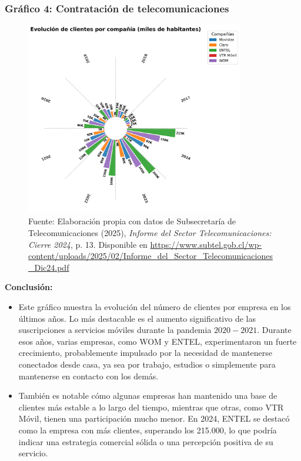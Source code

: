 \documentclass[12pt, a4paper]{article}
\begin{document}
\subsubsection*{Gráfico 4: Contratación de telecomunicaciones}
\begin{figure}[H]
    \centering
    \includegraphics[width=0.85\textwidth]{images/graph2_JG.png}
    \caption{
        Fuente: Elaboración propia con datos de Subsecretaría de Telecomunicaciones (2025), 
        \textit{Informe del Sector Telecomunicaciones: Cierre 2024}, p. 13. 
        Disponible en \url{https://www.subtel.gob.cl/wp-content/uploads/2025/02/Informe_del_Sector_Telecomunicaciones_Dic24.pdf}
    }

\end{figure}


\textbf{Conclusión:}  
\begin{itemize}
    \item Este gráfico muestra la evolución del número de clientes por empresa en los últimos años. Lo más destacable es el aumento significativo de las suscripciones a servicios móviles durante la pandemia \(2020-2021\).
    Durante esos años, varias empresas, como WOM y ENTEL, experimentaron un fuerte crecimiento, probablemente impulsado por la necesidad de mantenerse conectados desde casa, ya sea por trabajo, estudios o simplemente para mantenerse en contacto con los demás.
    \item También es notable cómo algunas empresas han mantenido una base de clientes más estable a lo largo del tiempo, mientras que otras, como VTR Móvil, tienen una participación mucho menor. En 2024, ENTEL se destacó como la empresa con más clientes, superando los 215.000, lo que podría indicar una estrategia comercial sólida o una percepción positiva de su servicio.

\end{itemize}



\end{document}
